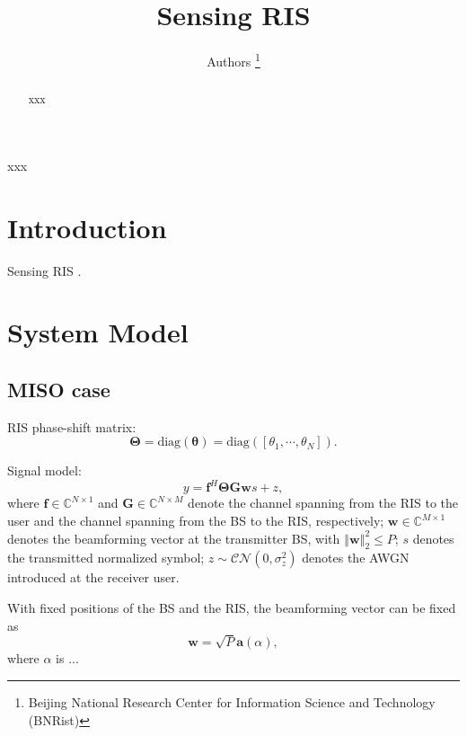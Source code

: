 \documentclass[12pt,draftclsnofoot,journal,onecolumn]{IEEEtran}
\theoremstyle{nonumberplain}
\def \diag {\text{diag}}
\begin{document}
\title{Sensing RIS}
\author{{Authors
\vspace*{-1em}}
\thanks{Beijing National Research Center for Information Science and Technology (BNRist)}
}

\maketitle

\begin{abstract}
xxx
\end{abstract}

\begin{IEEEkeywords}
xxx
\end{IEEEkeywords}
\section{Introduction}
    Sensing RIS \cite{ma2020smartsensing}.
\section{System Model}
\label{System Model}
\subsection{MISO case}
\label{MISO case}

RIS phase-shift matrix:
\begin{equation}
\label{RIS}
\bm \Theta = \diag \left(\bm \theta\right )=\diag \left(\left[\theta_{1},\cdots ,\theta_{N}\right]\right).
\end{equation}

Signal model:
\begin{equation}
\label{Signal model}
y=\bm f^{H}\bm \Theta\bm G\bm ws+z,
\end{equation}
where $\bm f\in \mathbb C ^{N\times 1}$ and $\bm G \in \mathbb C^{N\times M}$ denote the channel spanning from the RIS to the user and the channel spanning from the BS to the RIS, respectively; $\bm w\in \mathbb C^{M\times 1}$ denotes the beamforming vector at the transmitter BS, with $\left\Vert \bm w\right \Vert_{2}^{2}\leq P$; $s$ denotes the transmitted normalized symbol; $z\sim \mathcal{CN}\left(0,\sigma_{z}^{2}\right)$ denotes the \ac{AWGN} introduced at the receiver user.

With fixed positions of the BS and the RIS, the beamforming vector can be fixed as
\begin{equation}
\label{fixed w}
\bm w=\sqrt{P}\bm a\left(\alpha\right),
\end{equation}
where $\alpha$ is ...
\end{document}
